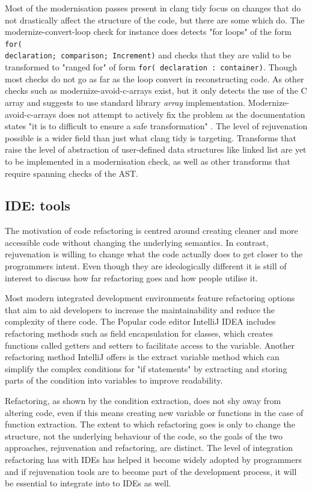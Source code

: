 \documentclass[bsc,frontabs,singlespacing,twoside,parskip,deptreport]{infthesis}
\begin{document}
Most of the modernisation passes present in clang tidy focus on changes that do not drastically affect the structure of the code, but there are some which do. The modernize-convert-loop check \cite{FOR_CONVERT} for instance does detects "for loops" of the form \texttt{for( \\declaration; comparison; Increment)} and checks that they are valid to be transformed to "ranged for" of  form \texttt{for( declaration : container)}. Though most checks do not go as far as the loop convert in reconstructing code. As other checks such as modernize-avoid-c-arrays \cite{ARRAY_CONVERT} exist, but it only detects the use of the C array and suggests to use standard library \textit{array} implementation. Modernize-avoid-c-arrays does not attempt to actively fix the problem as the documentation states "it is to difficult to ensure a safe transformation" \cite{ARRAY_CONVERT}. The level of rejuvenation possible is a wider field than just what clang tidy is targeting. Transforms that raise the level of abstraction of user-defined data structures like linked list are yet to be implemented in a modernisation check, as well as other transforms that require spanning checks of the AST.   

\subsection{IDE: tools}
The motivation of code refactoring is centred around creating cleaner and more accessible code without changing the underlying semantics. In contrast, rejuvenation is willing to change what the code actually does to get closer to the programmers intent. Even though they are ideologically different it is still of interest to discuss how far refactoring goes and how people utilise it.

Most modern integrated development environments feature refactoring options that aim to aid developers to increase the maintainability and reduce the complexity of there code. The Popular code editor IntelliJ IDEA \cite{IDEA} includes refactoring methods such as field encapsulation \cite{IDEA_ENCAP} for classes, which creates functions called getters and setters to facilitate access to the variable. Another refactoring method IntelliJ offers is the extract variable  \cite{IDEA_EXTRACT} method which can simplify the complex conditions for "if statements" by extracting and storing parts of the condition into variables to improve readability.

Refactoring, as shown by the condition extraction, does not shy away from altering code, even if this means creating new variable or functions in the case of function extraction. The extent to which refactoring goes is only to change the structure, not the underlying behaviour of the code, so the goals of the two approaches, rejuvenation and refactoring, are distinct. The level of integration refactoring has with IDEs has helped it become widely adopted by programmers and if rejuvenation tools are to become part of the development process, it will be essential to integrate into to IDEs as well.
\end{document}
